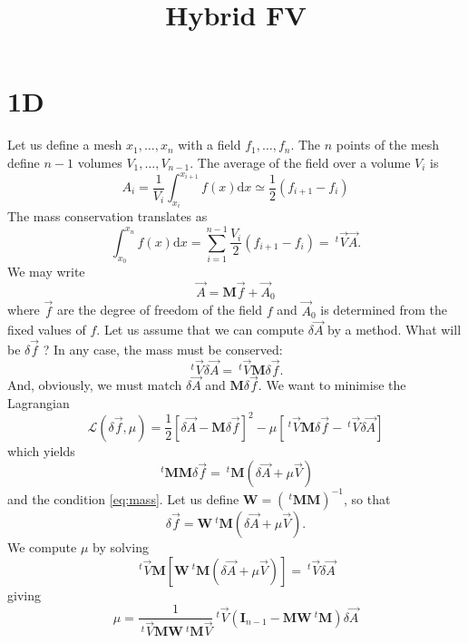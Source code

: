 \documentclass{revtex4}
\newcommand{\trn}{\!\!~^t}
\begin{document}
	\title{Hybrid FV}
	\maketitle

\section{1D}
Let us define a mesh $x_1,\ldots,x_n$ with a field $f_1,\ldots,f_n$.
The $n$ points of the mesh define $n-1$ volumes $V_1,\ldots,V_{n-1}$.
The average of the field over a volume $V_i$ is
\begin{equation}
	A_i = \dfrac{1}{V_i}\int_{x_{i}}^{x_{i+1}} f(x) \mathrm{d}x \simeq \dfrac{1}{2}\left(f_{i+1}-f_i\right)
\end{equation}
The mass conservation translates as
\begin{equation}
	\int_{x_0}^{x_n} f(x) \mathrm{d}x = \sum_{i=1}^{n-1} \dfrac{V_i}{2} \left(f_{i+1}-f_{i}\right) = \trn{\vec{V}}\vec{A}.
\end{equation}
We may write
\begin{equation}
	\vec{A} = \bm{M} \vec{f} + \vec{A}_0
\end{equation}
where $\vec{f}$ are the degree of freedom of the field $f$ and $\vec{A}_0$ is determined from the fixed values of $f$.
Let us assume that we can compute $\delta\vec{A}$ by a method. What will be $\delta\vec{f}$ ?
In any case, the mass must be conserved:
\begin{equation}
	\label{eq:mass}
	\trn{\vec{V}}\delta\vec{A} = \trn{\vec{V}}\bm{M}\delta\vec{f}.
\end{equation}
And, obviously, we must match $\delta\vec{A}$ and $\bm{M}\delta\vec{f}$.
We want to minimise the Lagrangian
\begin{equation}
	\mathcal{L}\left(\delta\vec{f},\mu\right) = \dfrac{1}{2}\left[\delta\vec{A} - \bm{M}\delta\vec{f}\right]^2 - \mu\left[\trn{\vec{V}}\bm{M}\delta\vec{f}-\trn{\vec{V}}\delta\vec{A}\right]
\end{equation}
which yields
\begin{equation}
	\trn{\bm{M}}\bm{M} \delta\vec{f} = \trn{\bm{M}}\left( \delta\vec{A} + \mu \vec{V} \right)
\end{equation}
and the condition \eqref{eq:mass}.
Let us define $\bm{W} = (\trn{\bm{M}}\bm{M})^{-1}$, so that
\begin{equation}
		\delta\vec{f} = \bm{W}\trn{\bm{M}}\left( \delta\vec{A} + \mu \vec{V} \right).
\end{equation}
We compute $\mu$ by solving
\begin{equation}
	\trn{\vec{V}} \bm{M} \left[ \bm{W}\trn{\bm{M}}\left( \delta\vec{A} + \mu \vec{V} \right) \right] = \trn{\vec{V}}\delta\vec{A}
\end{equation}
giving
\begin{equation}
	\mu = \dfrac{1}{\trn{\vec{V}} \bm{M}\bm{W}\trn{\bm{M}} \vec{V}} \trn{\vec{V}}\left(\bm{I}_{n-1} - \bm{M}\bm{W}\trn{\bm{M}} \right) \delta\vec{A}
\end{equation}
\end{document}

